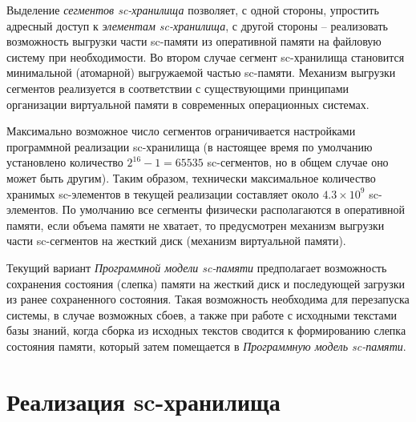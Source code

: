 Выделение \textit{сегментов sc-хранилища} позволяет, с одной стороны, упростить адресный доступ к \textit{элементам sc-хранилища}, с другой стороны -- реализовать возможность выгрузки части sc-памяти из оперативной памяти на файловую систему при необходимости. Во втором случае сегмент sc-хранилища становится минимальной (атомарной) выгружаемой частью sc-памяти. Механизм выгрузки сегментов реализуется в соответствии с существующими принципами организации виртуальной памяти в современных операционных системах.

Максимально возможное число сегментов ограничивается настройками программной реализации sc-хранилища (в настоящее время по умолчанию установлено количество $2^{16}-1=65535$ sc-сегментов, но в общем случае оно может быть другим). Таким образом, технически максимальное количество хранимых sc-элементов в текущей реализации составляет около $4.3 \times 10^{9}$ sc-элементов. По умолчанию все сегменты физически располагаются в оперативной памяти, если объема памяти не хватает, то предусмотрен механизм выгрузки части sc-сегментов на жесткий диск (механизм виртуальной памяти).

Текущий вариант \textit{Программной модели sc-памяти} предполагает возможность сохранения состояния (слепка) памяти на жесткий диск и последующей загрузки из ранее сохраненного состояния. Такая возможность необходима для перезапуска системы, в случае возможных сбоев, а также при работе с исходными текстами базы знаний, когда сборка из исходных текстов сводится к формированию слепка состояния памяти, который затем помещается в \textit{Программную модель sc-памяти}.

\section{Реализация sc-хранилища}
\label{sec_soft_platform_sc_storage}

